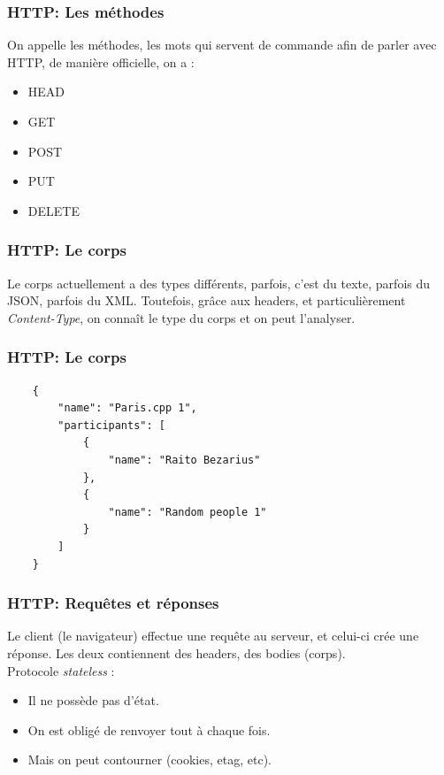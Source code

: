 \documentclass[10pt, compress]{beamer}
\begin{document}
\begin{frame}[fragile]
	\frametitle{HTTP: Les méthodes}
    
    On appelle les méthodes, les mots qui servent de \og{} commande \fg{} afin de parler avec HTTP, de manière officielle, on a :
    \pause
    \begin{itemize}[<+->]
    	\item HEAD
        \item GET
        \item POST
        \item PUT
        \item DELETE
    \end{itemize}
\end{frame}
\begin{frame}[fragile]
	\frametitle{HTTP: Le corps}
    
    Le corps actuellement a des types différents, parfois, c'est du texte, parfois du JSON, parfois du XML. Toutefois, grâce aux headers, et particulièrement \emph{Content-Type}, on connaît le type du corps et on peut l'analyser.
\end{frame}
\begin{frame}[fragile]
	\frametitle{HTTP: Le corps}
    
    \begin{verbatim}
    {
        "name": "Paris.cpp 1",
        "participants": [
        	{
            	"name": "Raito Bezarius"
            },
            { 
            	"name": "Random people 1"
            }
        ]
    }
    \end{verbatim}
\end{frame}
\begin{frame}[fragile]
	\frametitle{HTTP: Requêtes et réponses}
    
    Le client (le navigateur) effectue une requête au serveur, et celui-ci crée une réponse. Les deux contiennent des headers, des bodies (corps). \pause
    \\
    Protocole \emph{stateless} :
    \begin{itemize}[<+->]
    	\item Il ne possède pas d'état.
    	\item On est obligé de renvoyer tout à chaque fois.
    	\item Mais on peut contourner (cookies, etag, etc).
  	\end{itemize}
\end{frame}
\end{document}
